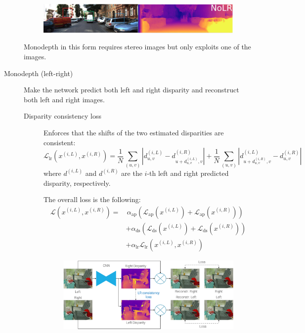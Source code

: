 \begin{description}
\begin{remark}
            \begin{figure}[H]
                \centering
                \includegraphics[width=0.9\linewidth]{./img/monodepth_no_lr_results.png}
            \end{figure}
        \end{remark}

        \begin{remark}
            Monodepth in this form requires stereo images but only exploits one of the images.
        \end{remark}


    \item[Monodepth (left-right)] 
        Make the network predict both left and right disparity and reconstruct both left and right images.

        \begin{description}
            \item[Disparity consistency loss] 
                Enforces that the shifts of the two estimated disparities are consistent:
                \[ \mathcal{L}_{\text{lr}}(x^{(i, L)}, x^{(i, R)}) = \frac{1}{N} \sum_{(u, v)} \left| d_{u, v}^{(i, L)} - d^{(i, R)}_{u+d_{u, v}^{(i, L)}, v} \right| + \frac{1}{N} \sum_{(u, v)} \left| d_{u+d_{u, v}^{(i, R)}, v}^{(i, L)} - d^{(i, R)}_{u, v} \right| \]
                where $d^{(i, L)}$ and $d^{(i, R)}$ are the $i$-th left and right predicted disparity, respectively.

                The overall loss is the following:
                \[ 
                    \begin{split}
                        \mathcal{L}(x^{(i, L)}, x^{(i, R)}) = &\,\alpha_\text{ap} \left( \mathcal{L}_\text{ap}(x^{(i, L)}) + \mathcal{L}_\text{ap}(x^{(i, R)}) \right) \\
                            &+ \alpha_\text{ds} \left( \mathcal{L}_\text{ds}(x^{(i, L)}) + \mathcal{L}_\text{ds}(x^{(i, R)}) \right) \\
                            &+ \alpha_\text{lr} \mathcal{L}_\text{lr}(x^{(i, L)}, x^{(i, R)})
                    \end{split}
                \]

                \begin{figure}[H]
                    \centering
                    \includegraphics[width=0.7\linewidth]{./img/_monodepth_lr.pdf}
                \end{figure}


\end{description}
\end{description}
